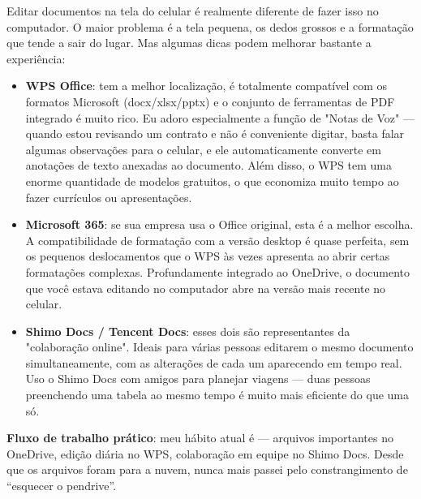 


Editar documentos na tela do celular é realmente diferente de fazer isso no computador. O maior problema é a tela pequena, os dedos grossos e a formatação que tende a sair do lugar. Mas algumas dicas podem melhorar bastante a experiência:

\begin{itemize}
  \item \textbf{WPS Office}: tem a melhor localização, é totalmente compatível com os formatos Microsoft (docx/xlsx/pptx) e o conjunto de ferramentas de PDF integrado é muito rico. Eu adoro especialmente a função de "Notas de Voz" — quando estou revisando um contrato e não é conveniente digitar, basta falar algumas observações para o celular, e ele automaticamente converte em anotações de texto anexadas ao documento. Além disso, o WPS tem uma enorme quantidade de modelos gratuitos, o que economiza muito tempo ao fazer currículos ou apresentações.
  \item \textbf{Microsoft 365}: se sua empresa usa o Office original, esta é a melhor escolha. A compatibilidade de formatação com a versão desktop é quase perfeita, sem os pequenos deslocamentos que o WPS às vezes apresenta ao abrir certas formatações complexas. Profundamente integrado ao OneDrive, o documento que você estava editando no computador abre na versão mais recente no celular.
  \item \textbf{Shimo Docs / Tencent Docs}: esses dois são representantes da "colaboração online". Ideais para várias pessoas editarem o mesmo documento simultaneamente, com as alterações de cada um aparecendo em tempo real. Uso o Shimo Docs com amigos para planejar viagens — duas pessoas preenchendo uma tabela ao mesmo tempo é muito mais eficiente do que uma só.
\end{itemize}

\textbf{Fluxo de trabalho prático}: meu hábito atual é — arquivos importantes no OneDrive, edição diária no WPS, colaboração em equipe no Shimo Docs. Desde que os arquivos foram para a nuvem, nunca mais passei pelo constrangimento de “esquecer o pendrive”.

